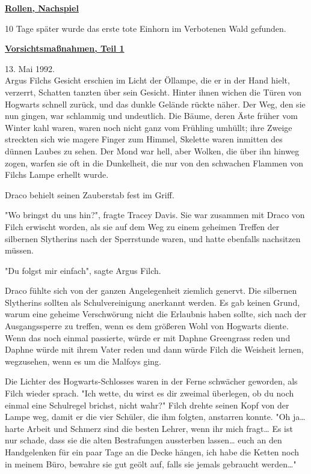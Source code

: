 

\hypertarget{rollen-nachspiel-vorsichtsmauxdfnahmen-teil-1}{%

\textbf{\uline{Rollen, Nachspiel}}

10 Tage später wurde das erste tote Einhorn im Verbotenen Wald gefunden.

\textbf{\uline{Vorsichtsmaßnahmen, Teil 1}}

13. Mai 1992.\\ Argus Filchs Gesicht erschien im Licht der Öllampe, die er in der Hand hielt, verzerrt, Schatten tanzten über sein Gesicht. Hinter ihnen wichen die Türen von Hogwarts schnell zurück, und das dunkle Gelände rückte näher. Der Weg, den sie nun gingen, war schlammig und undeutlich. Die Bäume, deren Äste früher vom Winter kahl waren, waren noch nicht ganz vom Frühling umhüllt; ihre Zweige streckten sich wie magere Finger zum Himmel, Skelette waren inmitten des dünnen Laubes zu sehen. Der Mond war hell, aber Wolken, die über ihn hinweg zogen, warfen sie oft in die Dunkelheit, die nur von den schwachen Flammen von Filchs Lampe erhellt wurde.

Draco behielt seinen Zauberstab fest im Griff.

"Wo bringst du uns hin?", fragte Tracey Davis. Sie war zusammen mit Draco von Filch erwischt worden, als sie auf dem Weg zu einem geheimen Treffen der silbernen Slytherins nach der Sperrstunde waren, und hatte ebenfalls nachsitzen müssen.

"Du folgst mir einfach", sagte Argus Filch.

Draco fühlte sich von der ganzen Angelegenheit ziemlich genervt. Die silbernen Slytherins sollten als Schulvereinigung anerkannt werden. Es gab keinen Grund, warum eine geheime Verschwörung nicht die Erlaubnis haben sollte, sich nach der Ausgangssperre zu treffen, wenn es dem größeren Wohl von Hogwarts diente. Wenn das noch einmal passierte, würde er mit Daphne Greengrass reden und Daphne würde mit ihrem Vater reden und dann würde Filch die Weisheit lernen, wegzusehen, wenn es um die Malfoys ging.

Die Lichter des Hogwarts-Schlosses waren in der Ferne schwächer geworden, als Filch wieder sprach. "Ich wette, du wirst es dir zweimal überlegen, ob du noch einmal eine Schulregel brichst, nicht wahr?" Filch drehte seinen Kopf von der Lampe weg, damit er die vier Schüler, die ihm folgten, anstarren konnte. "Oh ja… harte Arbeit und Schmerz sind die besten Lehrer, wenn ihr mich fragt… Es ist nur schade, dass sie die alten Bestrafungen aussterben lassen… euch an den Handgelenken für ein paar Tage an die Decke hängen, ich habe die Ketten noch in meinem Büro, bewahre sie gut geölt auf, falls sie jemals gebraucht werden…"

}
